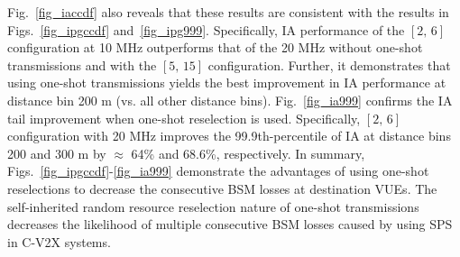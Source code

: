 \documentclass[conference]{IEEEtran}
\begin{document}
Fig.~\ref{fig_iaccdf} also reveals that these results are consistent with the results in Figs.~\ref{fig_ipgccdf} and~\ref{fig_ipg999}. Specifically, IA performance of the $[2,\,6]$ configuration at 10 MHz outperforms that of the 20 MHz without one-shot transmissions and with the $[5,\,15]$ configuration. Further, it demonstrates that using one-shot transmissions yields the best improvement in IA performance at distance bin 200 m (vs. all other distance bins). Fig.~\ref{fig_ia999} confirms the IA tail improvement when one-shot reselection is used. Specifically, $[2,\,6]$ configuration with 20 MHz improves the 99.9th-percentile of IA at distance bins 200 and 300 m by $\approx$ 64\% and 68.6\%, respectively. In summary, Figs.~\ref{fig_ipgccdf}-\ref{fig_ia999} demonstrate the advantages of using one-shot reselections to decrease the consecutive BSM losses at destination VUEs. The self-inherited random resource reselection nature of one-shot transmissions decreases the likelihood of multiple consecutive BSM losses caused by using SPS in C-V2X systems.
\end{document}
